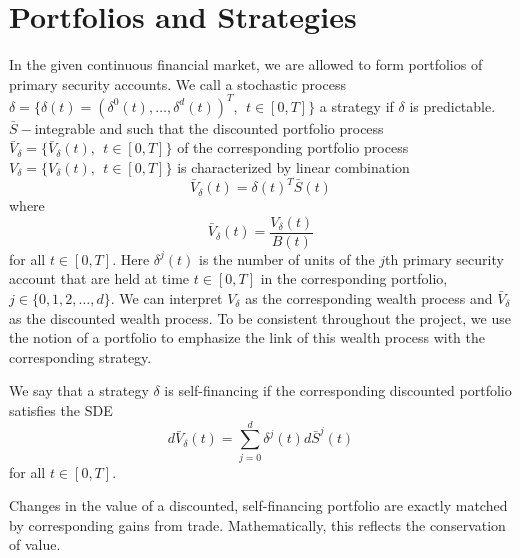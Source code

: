\documentclass[a4 paper, 12pt]{report}
\theoremstyle{plain}
\begin{document}
\section{Portfolios and Strategies}
\noindent
\par In the given continuous financial market, we are allowed to form portfolios of primary security accounts. We call a stochastic process $\delta = \{\delta(t) = (\delta^0(t),\ldots, \delta^d(t))^T,~~t\in [0,T]\}$ a strategy if $\delta$ is predictable. $\bar{S}-$integrable and such that the discounted portfolio process $\bar{V}_\delta = \{\bar{V}_\delta(t),~~t\in[0,T]\}$ of the corresponding portfolio process $V_\delta = \{V_\delta(t),~~t\in[0,T]\}$ is characterized by linear combination
\begin{equation}\label{2.6}
\bar{V}_\delta(t) = \delta(t)^T\bar{S}(t)
\end{equation}
where
\begin{equation}\label{2.7}
\bar{V}_\delta(t) = \frac{V_\delta(t)}{B(t)}
\end{equation}
for all $t\in[0,T]$. Here $\delta^j(t)$ is the number of units of the $j$th primary security account that are held at time $t\in [0,T]$ in the corresponding portfolio, $j\in\{0,1,2,\ldots,d\}$. We can interpret $V_\delta$ as the corresponding wealth process and $\bar{V}_\delta$ as the discounted wealth process. To be consistent throughout the project, we use the notion of a portfolio to emphasize the link of this wealth process with the corresponding strategy.\\
\par We say that a strategy $\delta$ is self-financing if the corresponding discounted portfolio satisfies the SDE
\begin{equation}\label{2.8}
d\bar{V}_\delta(t) = \sum_{j = 0}^d\delta^j(t)d\bar{S}^j(t)
\end{equation}
for all $t\in[0,T]$.\\
\par Changes in the value of a discounted, self-financing portfolio are exactly matched by corresponding gains from trade. Mathematically, this reflects the conservation of value.
\end{document}
